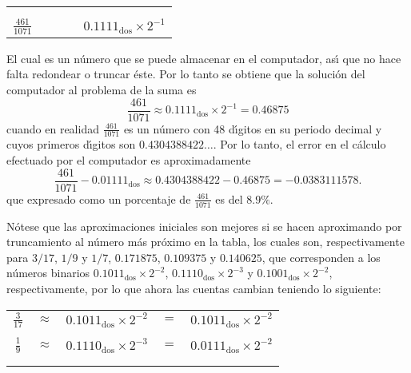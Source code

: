 \begin{solucion}
\begin{enumerate}
\begin{center}
\begin{tabular}{ccccc}
    \vspace{-0.4cm}
    \\
    \hhline{-~~~-}
    \vspace{-0.4cm}
    \\
    $\frac{461}{1071}$ & & & & $0.1111_{\text{dos}} \times 2^{-1}$
   \end{tabular}
  \end{center}
  El cual es un n\'umero que se puede almacenar en el computador, as\'{\i} que no hace falta redondear o truncar \'este. Por lo tanto se obtiene que la soluci\'on del computador al problema de la suma es
  \begin{equation*}
   \frac{461}{1071} \approx 0.1111_{\text{dos}} \times 2^{-1} = 0.46875
  \end{equation*}
  cuando en realidad $\frac{461}{1071}$ es un n\'umero con 48 d\'{\i}gitos en su periodo decimal y cuyos primeros d\'{\i}gitos son $0.4304388422\ldots$. Por lo tanto, el error en el c\'alculo efectuado por el computador es aproximadamente
  \begin{equation*}
   \frac{461}{1071} - 0.01111_{\text{dos}} \approx 0.4304388422 - 0.46875 = -0.0383111578.
  \end{equation*}
  que expresado como un porcentaje de $\frac{461}{1071}$ es del $8.9\%$.
  \par 
  N\'otese que las aproximaciones iniciales son mejores si se hacen aproximando por truncamiento al n\'umero m\'as pr\'oximo en la tabla, los cuales son, respectivamente para $3/17$, $1/9$ y $1/7$, $0.171875$, $0.109375$ y $0.140625$, que corresponden a los n\'umeros binarios $0.1011_{\text{dos}}\times 2^{-2}$, $0.1110_{\text{dos}}\times 2^{-3}$ y $0.1001_{\text{dos}} \times 2^{-2}$, respectivamente, por lo que ahora las cuentas cambian teniendo lo siguiente:
  \begin{center}
   \begin{tabular}{ccccc}
    $\frac{3}{17}$ & $\approx$ & $0.1011_{\text{dos}} \times 2^{-2}$ & $=$ & $0.1011_{\text{dos}} \times 2^{-2}$ \\
    \vspace{-0.3cm} 
    \\
    $\frac{1}{9}$ & $\approx$ & $0.1110_{\text{dos}}\times 2^{-3}$ & $=$ & $0.0111_{\text{dos}} \times 2^{-2}$ \\ 
    \vspace{-0.4cm}
    \\
    \hhline{-~~~-}
    \vspace{-0.4cm}
    \\

\end{tabular}
\end{center}
\end{enumerate}
\end{solucion}
